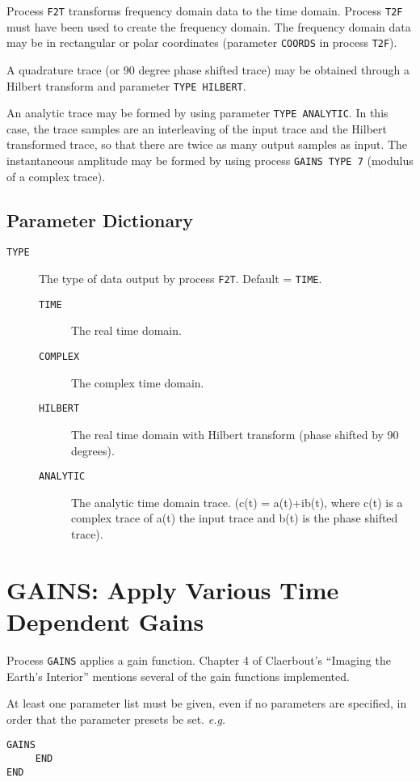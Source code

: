 Process \texttt{F2T} transforms frequency domain data to the time domain.
Process \texttt{T2F} must have been used to create the frequency domain.  The
frequency domain data may be in rectangular or polar coordinates
(parameter \texttt{COORDS} in process \texttt{T2F}).

A quadrature trace (or 90 degree phase shifted trace) may be obtained
through a Hilbert transform and parameter \texttt{TYPE HILBERT}.

An analytic trace may be formed by using parameter \texttt{TYPE ANALYTIC}.  In
this case, the trace samples are an interleaving of the input trace
and the Hilbert transformed trace, so that there are twice as many
output samples as input.  The instantaneous amplitude may be formed
by using process \texttt{GAINS TYPE 7} (modulus of a complex trace).

\subsection{Parameter Dictionary}

\begin{description}
\item[\texttt{TYPE}] The type of data output by process \texttt{F2T}.  Default = \texttt{TIME}.
\begin{description}
\item[\texttt{TIME}]  The real time domain.
\item[\texttt{COMPLEX}]  The complex time domain.
\item[\texttt{HILBERT}]  The real time domain with Hilbert transform (phase shifted by 90 degrees).
\item[\texttt{ANALYTIC}]  The analytic time domain trace. (c(t) = a(t)+ib(t), where c(t) is a complex trace of a(t) the input trace and b(t) is the phase shifted trace).
\end{description}
\end{description}

\section{GAINS: Apply Various Time Dependent Gains}
\label{cmd_gains}

Process \texttt{GAINS} applies a gain function.  Chapter 4 of Claerbout's ``Imaging the
Earth's Interior'' \cite{Claerbout1985} mentions several of the gain functions implemented.

At least one parameter list must be given, even if no parameters are
specified, in order that the parameter presets be set.  \textit{e.g.}
\begin{verbatim}
GAINS
     END
END
\end{verbatim}


